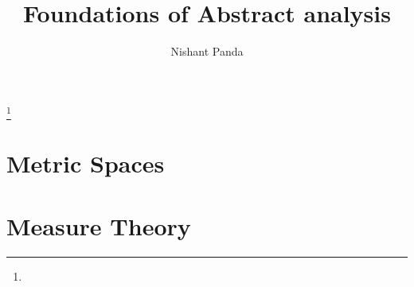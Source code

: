 \documentclass{gsm-l}
\begin{document}
\frontmatter

\title{Foundations of Abstract analysis}

\author{Nishant Panda}
\address{2451 S. Timberline Rd, Apt 4, Fort Collins, Co 80525}
\curraddr{}
\thanks{}



\maketitle
\setcounter{page}{5}
\tableofcontents

%

\mainmatter{}
\part{Metric Spaces}

\part{Measure Theory}





\appendix


\backmatter{}
%
%

\printindex
\end{document}
